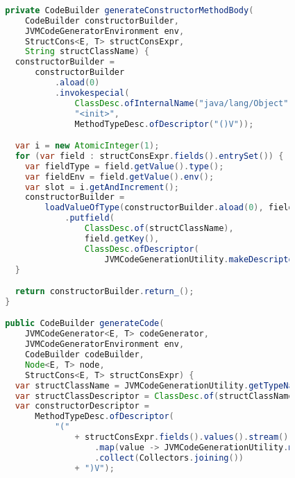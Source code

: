 \begin{figure}[H]
  \centering
  \begin{lstlisting}[language=Java]
    
  private CodeBuilder generateConstructorMethodBody(
      CodeBuilder constructorBuilder,
      JVMCodeGeneratorEnvironment env,
      StructCons<E, T> structConsExpr,
      String structClassName) {
    constructorBuilder =
        constructorBuilder
            .aload(0)
            .invokespecial(
                ClassDesc.ofInternalName("java/lang/Object"),
                "<init>",
                MethodTypeDesc.ofDescriptor("()V"));

    var i = new AtomicInteger(1);
    for (var field : structConsExpr.fields().entrySet()) {
      var fieldType = field.getValue().type();
      var fieldEnv = field.getValue().env();
      var slot = i.getAndIncrement();
      constructorBuilder =
          loadValueOfType(constructorBuilder.aload(0), fieldEnv, fieldType, slot)
              .putfield(
                  ClassDesc.of(structClassName),
                  field.getKey(),
                  ClassDesc.ofDescriptor(
                      JVMCodeGenerationUtility.makeDescriptor(field.getValue().type(), env)));
    }

    return constructorBuilder.return_();
  }

  public CodeBuilder generateCode(
      JVMCodeGenerator<E, T> codeGenerator,
      JVMCodeGeneratorEnvironment env,
      CodeBuilder codeBuilder,
      Node<E, T> node,
      StructCons<E, T> structConsExpr) {
    var structClassName = JVMCodeGenerationUtility.getTypeName(node.type(), node.env());
    var structClassDescriptor = ClassDesc.of(structClassName);
    var constructorDescriptor =
        MethodTypeDesc.ofDescriptor(
            "("
                + structConsExpr.fields().values().stream()
                    .map(value -> JVMCodeGenerationUtility.makeDescriptor(value.type(), env))
                    .collect(Collectors.joining())
                + ")V");


\end{lstlisting}
\end{figure}
